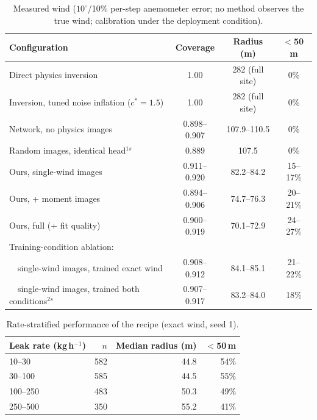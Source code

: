 \documentclass[conference]{IEEEtran}
\begin{document}
\begin{table}[h]
\centering
\caption{Measured wind ($10^\circ$/10\% per-step anemometer error; no
method observes the true wind; calibration under the deployment
condition).}
\begin{tabular}{lccc}
\toprule
Configuration & Coverage & Radius (m) & $<$50\,m \\
\midrule
Direct physics inversion & 1.00 & 282 (full site) & 0\% \\
Inversion, tuned noise inflation ($c^\ast{=}1.5$) & 1.00 & 282 (full site) & 0\% \\
Network, no physics images & 0.898--0.907 & 107.9--110.5 & 0\% \\
Random images, identical head$^{1s}$ & 0.889 & 107.5 & 0\% \\
Ours, single-wind images & 0.911--0.920 & 82.2--84.2 & 15--17\% \\
Ours, + moment images & 0.894--0.906 & 74.7--76.3 & 20--21\% \\
Ours, full (+ fit quality) & 0.900--0.919 & 70.1--72.9 & 24--27\% \\
\midrule
Training-condition ablation: & & & \\
~~single-wind images, trained exact wind & 0.908--0.912 & 84.1--85.1 & 21--22\% \\
~~single-wind images, trained both conditions$^{2s}$ & 0.907--0.917 & 83.2--84.0 & 18\% \\
\bottomrule
\end{tabular}
\end{table}

\begin{table}[h]
\centering
\caption{Rate-stratified performance of the recipe (exact wind, seed 1).}
\begin{tabular}{lrrr}
\toprule
Leak rate (kg\,h$^{-1}$) & $n$ & Median radius (m) & $<$50\,m \\
\midrule
10--30 & 582 & 44.8 & 54\% \\
30--100 & 585 & 44.5 & 55\% \\
100--250 & 483 & 50.3 & 49\% \\
250--500 & 350 & 55.2 & 41\% \\
\bottomrule
\end{tabular}
\end{table}
\end{document}
